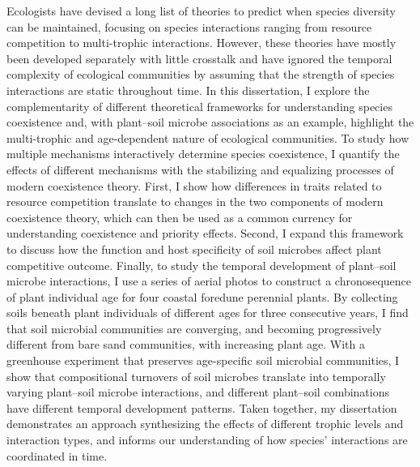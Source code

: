 Ecologists have devised a long list of theories to predict when species diversity can be maintained, focusing on species interactions ranging from resource competition to multi-trophic interactions. 
However, these theories have mostly been developed separately with little crosstalk and have ignored the temporal complexity of ecological communities by assuming that the strength of species interactions are static throughout time.
In this dissertation, I explore the complementarity of different theoretical frameworks for understanding species coexistence and, with plant--soil microbe associations as an example, highlight the multi-trophic and age-dependent nature of ecological communities. 
To study how multiple mechanisms interactively determine species coexistence, I quantify the effects of different mechanisms with the stabilizing and equalizing processes of modern coexistence theory. 
First, I show how differences in traits related to resource competition translate to changes in the two components of modern coexistence theory, which can then be used as a common currency for understanding coexistence and priority effects.
Second, I expand this framework to discuss how the function and host specificity of soil microbes affect plant competitive outcome.
Finally, to study the temporal development of plant--soil microbe interactions, I use a series of aerial photos to construct a chronosequence of plant individual age for four coastal foredune perennial plants.
By collecting soils beneath plant individuals of different ages for three consecutive years, I find that soil microbial communities are converging, and becoming progressively different from bare sand communities, with increasing plant age.
With a greenhouse experiment that preserves age-specific soil microbial communities, I show that compositional turnovers of soil microbes translate into temporally varying plant--soil microbe interactions, and different plant--soil combinations have different temporal development patterns.
Taken together, my dissertation demonstrates an approach synthesizing the effects of different trophic levels and interaction types, and informs our understanding of how species' interactions are coordinated in time.